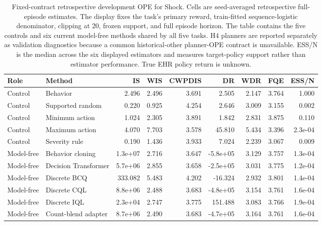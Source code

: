 \begin{table}[p]
\centering
\caption{Fixed-contract retrospective development OPE for Shock. Cells are seed-averaged retrospective full-episode estimates. The display fixes the task's primary reward, train-fitted sequence-logistic denominator, clipping at 20, frozen support, and full episode horizon. The table contains the five controls and six current model-free methods shared by all five tasks. H4 planners are reported separately as validation diagnostics because a common historical-other planner-OPE contract is unavailable. ESS/N is the median across the six displayed estimators and measures target-policy support rather than estimator performance. True EHR policy return is unknown.}
\label{tab:ope-estimator-shock}
\scriptsize
\setlength{\tabcolsep}{3.6pt}
\begin{tabular}{llrrrrrrr}
\toprule
Role & Method & IS & WIS & CWPDIS & DR & WDR & FQE & ESS/N \\
\midrule
Control & Behavior & 2.496 & 2.496 & 3.691 & 2.505 & 2.147 & 3.764 & 1.000 \\
Control & Supported random & 0.220 & 0.925 & 4.254 & 2.646 & 3.009 & 3.155 & 0.002 \\
Control & Minimum action & 1.024 & 2.305 & 3.891 & 1.842 & 2.831 & 3.875 & 0.110 \\
Control & Maximum action & 4.070 & 7.703 & 3.578 & 45.810 & 5.434 & 3.396 & 2.3e-04 \\
Control & Severity rule & 0.190 & 1.436 & 3.933 & 7.024 & 2.239 & 3.067 & 0.009 \\
\midrule
Model-free & Behavior cloning & 1.3e+07 & 2.716 & 3.647 & -5.8e+05 & 3.129 & 3.757 & 1.3e-04 \\
Model-free & Decision Transformer & 5.7e+06 & 2.855 & 3.658 & -2.5e+05 & 3.031 & 3.775 & 1.2e-04 \\
Model-free & Discrete BCQ & 333.082 & 5.483 & 4.202 & -16.324 & 2.932 & 3.801 & 1.4e-04 \\
Model-free & Discrete CQL & 8.8e+06 & 2.488 & 3.683 & -4.8e+05 & 3.154 & 3.761 & 1.6e-04 \\
Model-free & Discrete IQL & 2.3e+04 & 2.747 & 3.775 & 151.488 & 3.083 & 3.766 & 1.9e-04 \\
Model-free & Count-blend adapter & 8.7e+06 & 2.490 & 3.683 & -4.7e+05 & 3.164 & 3.761 & 1.6e-04 \\
\bottomrule
\end{tabular}
\end{table}

